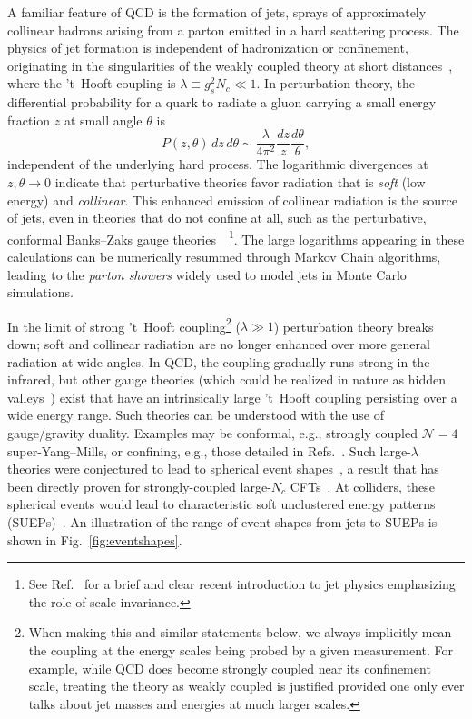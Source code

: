 A familiar feature of QCD is the formation of jets, sprays of approximately collinear hadrons arising from a parton emitted in a hard scattering process. The physics of jet formation is independent of hadronization or confinement, originating in the singularities of the weakly coupled theory at short distances~\cite{Sterman:1977wj}, where the 't~Hooft coupling is $\lambda \equiv g_s^2 N_c \ll 1$. In perturbation theory, the differential probability for a quark to radiate a gluon carrying a small energy fraction $z$ at small angle $\theta$ is
\begin{equation}
\label{eq:scsplit}
  P(z, \theta)\, dz\, d\theta \sim \frac{\lambda}{4\pi^2} \frac{dz}{z} \frac{d\theta}{\theta},
\end{equation}
independent of the underlying hard process. The logarithmic divergences at $z, \theta \to 0$ indicate that perturbative theories favor radiation that is \emph{soft} (low energy) and \emph{collinear}. This enhanced emission of collinear radiation is the source of jets, even in theories that do not confine at all, such as the perturbative, conformal Banks--Zaks gauge theories~\cite{Banks:1981nn}~\footnote{See Ref.~\cite{Larkoski:2017fip} for a brief and clear recent introduction to jet physics emphasizing the role of scale invariance.}. The large logarithms appearing in these calculations can be numerically resummed through Markov Chain algorithms, leading to the \emph{parton showers} widely used to model jets in Monte Carlo simulations.

In the limit of strong 't~Hooft coupling\footnote{When making this and similar statements below, we always implicitly mean the coupling at the energy scales being probed by a given measurement. For example, while QCD does become strongly coupled near its confinement scale, treating the theory as weakly coupled is justified provided one only ever talks about jet masses and energies at much larger scales.} ($\lambda \gg 1$) perturbation theory breaks down; soft and collinear radiation are no longer enhanced over more general radiation at wide angles. In QCD, the coupling gradually runs strong in the infrared, but other gauge theories (which could be realized in nature as hidden valleys~\cite{Strassler:2006im}) exist that have an intrinsically large 't~Hooft coupling persisting over a wide energy range. Such theories can be understood with the use of gauge/gravity duality. Examples may be conformal, e.g., strongly coupled $\mathcal{N} = 4$ super-Yang--Mills, or confining, e.g., those detailed in Refs.~\cite{Polchinski:2000uf, Klebanov:2000hb}. Such large-$\lambda$ theories were conjectured to lead to spherical event shapes~\cite{Strassler:2008bv}, a result that has been directly proven for strongly-coupled large-$N_c$ CFTs~\cite{Hofman:2008ar}. At colliders, these spherical events would lead to characteristic soft unclustered energy patterns (SUEPs)~\cite{Kang:2008ea, Harnik:2008ax, Knapen:2016hky}. An illustration of the range of event shapes from jets to SUEPs is shown in Fig.~\ref{fig:eventshapes}.

